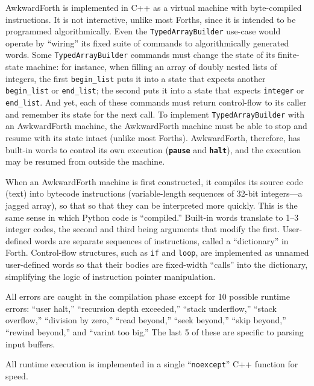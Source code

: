 \documentclass{webofc}
\begin{document}
AwkwardForth is implemented in C++ as a virtual machine with byte-compiled instructions. It is not interactive, unlike most Forths, since it is intended to be programmed algorithmically. Even the \texttt{TypedArrayBuilder} use-case would operate by ``wiring'' its fixed suite of commands to algorithmically generated words. Some \texttt{TypedArrayBuilder} commands must change the state of its finite-state machine: for instance, when filling an array of doubly nested lists of integers, the first \texttt{begin_list} puts it into a state that expects another \texttt{begin_list} or \texttt{end_list}; the second puts it into a state that expects \texttt{integer} or \texttt{end_list}. And yet, each of these commands must return control-flow to its caller and remember its state for the next call. To implement \texttt{TypedArrayBuilder} with an AwkwardForth machine, the AwkwardForth machine must be able to stop and resume with its state intact (unlike most Forths). AwkwardForth, therefore, has built-in words to control its own execution (\textcolor{OliveGreen}{\tt\textbf{pause}} and \textcolor{OliveGreen}{\tt\textbf{halt}}), and the execution may be resumed from outside the machine.

When an AwkwardForth machine is first constructed, it compiles its source code (text) into bytecode instructions (variable-length sequences of 32-bit integers---a jagged array), so that so that they can be interpreted more quickly. This is the same sense in which Python code is ``compiled.'' Built-in words translate to 1--3 integer codes, the second and third being arguments that modify the first. User-defined words are separate sequences of instructions, called a ``dictionary'' in Forth. Control-flow structures, such as \texttt{if} and \texttt{loop}, are implemented as unnamed user-defined words so that their bodies are fixed-width ``calls'' into the dictionary, simplifying the logic of instruction pointer manipulation.

All errors are caught in the compilation phase except for 10 possible runtime errors: ``user halt,'' ``recursion depth exceeded,'' ``stack underflow,'' ``stack overflow,'' ``division by zero,'' ``read beyond,'' ``seek beyond,'' ``skip beyond,'' ``rewind beyond,'' and ``varint too big.'' The last 5 of these are specific to parsing input buffers.

All runtime execution is implemented in a single ``\texttt{noexcept}'' C++ function for speed.
\end{document}
